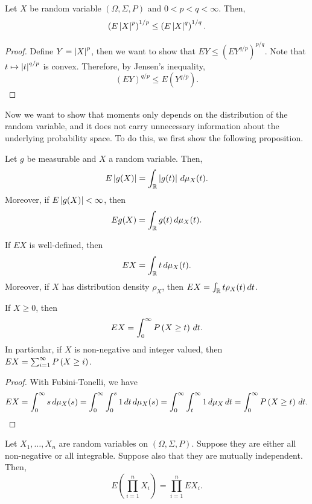 \documentclass[a4paper]{article}
\begin{document}
\begin{prop}
  Let $X$ be random variable $(\Omega, \Sigma, P)$ and 
  $0 < p < q < \infty$. Then, 
  \[
  \left( E \left\lvert X\right\rvert^p \right)^{1 / p} \leq \left( E \left\lvert X\right\rvert^q \right)^{1 / q}.
  \]
\end{prop}

\begin{proof}
  Define $Y = \left\lvert X\right\rvert^p$, then we want to show that 
  $E Y \leq (E Y^{q / p})^{p / q}$. Note that $t \mapsto \left\lvert t\right\rvert^{q / p}$
  is convex. Therefore, by Jensen's inequality, 
  \[
  \left( E Y \right)^{q / p}  \leq E \left( Y^{q / p} \right).
  \]

\end{proof}

Now we want to show that moments only depends on the distribution of the 
random variable, and it does not carry unnecessary information about the 
underlying probability space. To do this, we first show the following 
proposition.

\begin{prop}
  Let $g$ be measurable and $X$ a random variable. Then, 
  \[
  E \left\lvert g(X)\right\rvert = \int_{\mathbb{R}} \left\lvert g(t)\right\rvert \, d \mu_X (t).
  \]
  Moreover, if $E \left\lvert g(X)\right\rvert < \infty$, then 
  \[
  E g(X) = \int_{\mathbb{R}} g(t) \, d \mu_X (t).
  \]
\end{prop}

\begin{cor}
  If $E X$ is well-defined, then 
  \[
    E X = \int_{\mathbb{R}} t \, d \mu_X (t).
  \]
  Moreover, if $X$ has distribution density $\rho_X$, then
  $E X = \int_{\mathbb{R}} t \rho_X (t) \, d t$.
\end{cor}

\begin{prop}
  If $X \geq 0$, then
  \[
  E X = \int_0^\infty P \left( X \geq t \right) \, d t.
  \]
  In particular, if $X$ is non-negative and integer valued, then
  $E X = \sum_{i=1}^\infty P \left( X \geq i \right)$.
\end{prop}

\begin{proof}
  With Fubini-Tonelli, we have
  \[
  E X = \int_0^\infty s \, d \mu_X (s) 
  = \int_0^\infty \int_0^s 1 \, d t \, d \mu_X (s)
  = \int_0^\infty \int_t^\infty 1 \, d \mu_X \, d t 
  = \int_0^\infty P \left( X \geq t \right) \, d t.
  \]

\end{proof}

\begin{prop}
  Let $X_1, \dots, X_n$ are random variables on $(\Omega, \Sigma, P)$.
  Suppose they are either all non-negative or all integrable. 
  Suppose also that they are mutually independent. Then, 
  \[
  E \left( \prod_{i=1}^n X_i \right) = \prod_{i=1}^n E X_i.
  \]
\end{prop}
\end{document}
